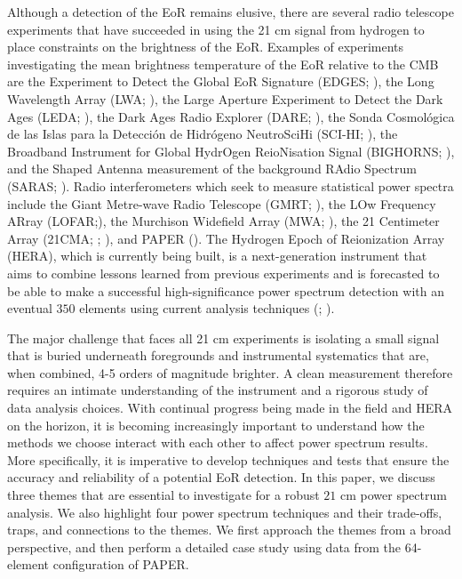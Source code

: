 \documentclass[preprint2,numberedappendix,tighten]{aastex6}  %
\begin{document}
Although a detection of the EoR remains elusive, there are several radio telescope experiments that have succeeded in using the 21 cm signal from hydrogen to place constraints on the brightness of the EoR. Examples of experiments investigating the mean brightness temperature of the EoR relative to the CMB are the Experiment to Detect the Global EoR Signature (EDGES; \citealt{bowman2010}), the Long Wavelength Array (LWA; \citealt{ellingson_et_al2009}),  the Large Aperture Experiment to Detect the Dark Ages (LEDA; \citealt{greenhill_bernardi2012}), the Dark Ages Radio Explorer (DARE; \citealt{burns2012}), the Sonda Cosmol\'ogica de las Islas para la Detecci\'on de Hidr\'ogeno NeutroSciHi (SCI-HI; \citealt{voytek2014}), the Broadband Instrument for Global HydrOgen ReioNisation Signal (BIGHORNS; \citealt{sokolowski2015}), and the Shaped Antenna measurement of the background RAdio Spectrum (SARAS; \citealt{patra2015}). Radio interferometers which seek to measure statistical power spectra include the Giant Metre-wave Radio Telescope (GMRT; \citealt{paciga_et_al2013}), the LOw Frequency ARray (LOFAR;\citealt{van_haarlem_et_al2013}), the Murchison Widefield Array (MWA; \citealt{tingay_et_al2013}), the 21 Centimeter Array (21CMA; \citealt{peterson_et_al2004}; \citealt{wu2009}), and PAPER (\citealt{parsons_et_al2010}). The Hydrogen Epoch of Reionization Array (HERA), which is currently being built, is a next-generation instrument that aims to combine lessons learned from previous experiments and is forecasted to be able to make a successful high-significance power spectrum detection with an eventual $350$ elements using current analysis techniques (\citealt{deboer_et_al2017}; \citealt{pober_et_al2014}).

The major challenge that faces all 21 cm experiments is isolating a small signal that is buried underneath foregrounds and instrumental systematics that are, when combined, 4-5 orders of magnitude brighter. A clean measurement therefore requires an intimate understanding of the instrument and a rigorous study of data analysis choices. With continual progress being made in the field and HERA on the horizon, it is becoming increasingly important to understand how the methods we choose interact with each other to affect power spectrum results. More specifically, it is imperative to develop techniques and tests that ensure the accuracy and reliability of a potential EoR detection. In this paper, we discuss three themes that are essential to investigate for a robust $21$ cm power spectrum analysis. We also highlight four power spectrum techniques and their trade-offs, traps, and connections to the themes. We first approach the themes from a broad perspective, and then perform a detailed case study using data from the 64-element configuration of PAPER.
\end{document}
